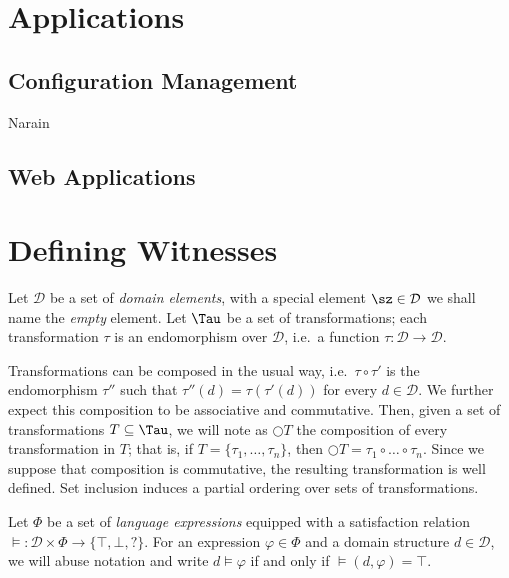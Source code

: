 

\section{Applications} %

\subsection{Configuration Management}

Narain

\subsection{Web Applications}


\section{Defining Witnesses} %

Let $\mathcal{D}$ be a set of \emph{domain elements}, with a special element $\sz \in \mathcal{D}$ we shall name the \emph{empty} element. Let $\Tau$ be a set of transformations; each transformation $\tau$ is an endomorphism over $\mathcal{D}$, i.e.\ a function $\tau : \mathcal{D} \rightarrow \mathcal{D}$.

Transformations can be composed in the usual way, i.e.\ $\tau \circ \tau'$ is the endomorphism $\tau''$ such that $\tau''(d) = \tau(\tau'(d))$ for every $d \in \mathcal{D}$. We further expect this composition to be associative and commutative. Then, given a set of transformations $T \subseteq \Tau$, we will note as $\bigcirc T$ the composition of every transformation in $T$; that is, if $T = \{\tau_1, \dots, \tau_n\}$, then $\bigcirc T = \tau_1 \circ \dots \circ \tau_n$. Since we suppose that composition is commutative, the resulting transformation is well defined. Set inclusion induces a partial ordering over sets of transformations.


Let $\Phi$ be a set of \emph{language expressions} equipped with a satisfaction relation $\models : \mathcal{D} \times \Phi \rightarrow \{\top,\bot,?\}$. For an expression $\varphi \in \Phi$ and a domain structure $d \in \mathcal{D}$, we will abuse notation and write $d \models \varphi$ if and only if $\models(d,\varphi) = \top$.

